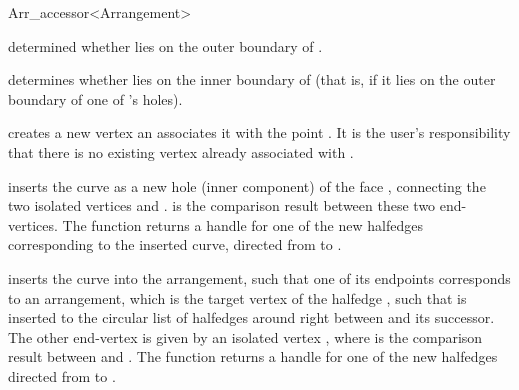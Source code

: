 \begin{ccRefClass}{Arr_accessor<Arrangement>}
\begin{ccAdvanced}
    {determined whether  lies on the outer boundary of .}

    {determines whether  lies on the inner boundary of 
     (that is, if it lies on the outer boundary of one of 's holes).}



    {creates a new vertex an associates it with the point .
     It is the user's responsibility that there is no existing vertex already
     associated with .}

   {inserts the curve  as a new hole (inner component) of the face
    , connecting the two isolated vertices  and .
     is the comparison result between these two end-vertices.
    The function returns a handle for one of the new halfedges
    corresponding to the inserted curve, directed from  to .
    }

  {inserts the curve  into the arrangement, such that one of its
   endpoints corresponds to an arrangement, which is the
   target vertex of the halfedge , such that  is inserted
   to the circular list of halfedges around  right
   between  and its successor. The other end-vertex is given by
   an isolated vertex ,
   where  is the comparison result between  and .
   The function returns a handle for one of the new halfedges directed from
    to .
   }


\end{ccAdvanced}
\end{ccRefClass}
